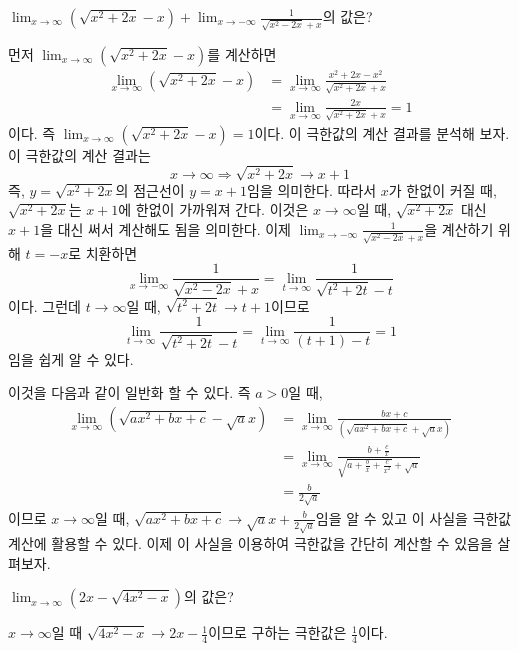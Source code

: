 \documentclass[11pt, a4paper]{book}
\begin{document}
\vskip 10pt
\begin{example} $\displaystyle\lim_{x\to\infty}\left(\sqrt{x^{2}+2x}-x\right)+\displaystyle\lim_{x\to -\infty}\frac{1}{\sqrt{x^{2}-2x}+x}$의 값은?
\begin{solution}
	먼저 $\displaystyle\lim_{x\to\infty}\left(\sqrt{x^{2}+2x}-x\right)$를 계산하면
	\begin{align*}
		\displaystyle\lim_{x\to\infty}\left(\sqrt{x^{2}+2x}-x\right)
		& =\displaystyle\lim_{x\to\infty}\frac{x^{2}+2x -x^{2}}{\sqrt{x^{2}+2x}+x}\\
		& =\displaystyle\lim_{x\to\infty}\frac{2x}{\sqrt{x^{2}+2x}+x}=1
	\end{align*}
	이다. 즉 $\displaystyle\lim_{x\to\infty}\left(\sqrt{x^{2}+2x}-x\right)=1$이다. 이 극한값의 계산 결과를 분석해 보자. 이 극한값의 계산 결과는
	\[
	x\to\infty \Rightarrow \sqrt{x^{2}+2x}\to x+1
	\] 즉, 
	$y =\sqrt{x^{2}+2x}$의 점근선이 $y = x+1$임을 의미한다. 따라서 $x$가 한없이 커질 때, $\sqrt{x^{2}+2x}$는 $x+1$에 한없이 가까워져 간다. 이것은 $x\to\infty$일 때, $\sqrt{x^{2}+2x}$ 대신 $x+1$을 대신 써서 계산해도 됨을 의미한다. 이제 $\displaystyle\lim_{x\to -\infty}\frac{1}{\sqrt{x^{2}-2x}+x}$을 계산하기 위해 $t= -x$로 치환하면 
	\[
	\displaystyle\lim_{x\to -\infty}\frac{1}{\sqrt{x^{2}-2x}+x}=\displaystyle\lim_{t\to\infty}\frac{1}{\sqrt{t^{2}+2t}-t}
	\]
	이다. 그런데 $t\to\infty$일 때, $\sqrt{t^{2}+2t}\to t+1$이므로 
	\[
	\displaystyle\lim_{t\to\infty}\frac{1}{\sqrt{t^{2}+2t}-t}=\displaystyle\lim_{t\to\infty}\frac{1}{(t+1)-t}= 1
	\]
	임을 쉽게 알 수 있다. 
\end{solution}
\end{example}

\vskip 10pt
이것을 다음과 같이 일반화 할 수 있다. 즉 $a>0$일 때,
\begin{align*}
\displaystyle\lim_{x\to\infty}\left(\sqrt{ax^{2}+bx+c}-\sqrt{a}x\right)
& =\displaystyle\lim_{x\to\infty}\frac{bx+c}{\left(\sqrt{ax^{2}+bx+c}+\sqrt{a}x\right)}\\
& =\displaystyle\lim_{x\to\infty}\frac{b+\frac{c}{x}}{\sqrt{a +\frac{b}{x}+\frac{c}{x^{2}}}+\sqrt{a}}\\
&=\frac{b}{2\sqrt{a}}
\end{align*}
이므로 $x\to\infty$일 때, $\sqrt{ax^{2}+bx+c}\to\sqrt{a}x +\frac{b}{2\sqrt{a}}$임을 알 수 있고 이 사실을 극한값 계산에 활용할 수 있다. 이제 이 사실을 이용하여 극한값을 간단히 계산할 수 있음을 살펴보자.

\begin{example}
$\displaystyle\lim_{x\to\infty}\left(2x -\sqrt{4x^{2}-x}\right)$의 값은?
\begin{solution}
	$x\to\infty$일 때 $\sqrt{4x^{2}-x}\to 2x -\frac{1}{4}$이므로 구하는 극한값은 $\frac{1}{4}$이다.
\end{solution}
\end{example}
\vskip 10pt
\end{document}
